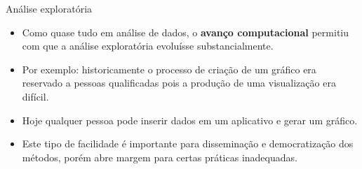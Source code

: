 \documentclass[
  ignorenonframetext,
  serif,
  professionalfont,
  usenames,
  dvipsnames,
  aspectratio = 169]{beamer}
\begin{document}
\begin{frame}{Análise exploratória}
\label{anuxe1lise-exploratuxf3ria-3}
\begin{itemize}
\item
  Como quase tudo em análise de dados, o \textbf{avanço computacional}
  permitiu com que a análise exploratória evoluísse substancialmente.
\item
  Por exemplo: historicamente o processo de criação de um gráfico era
  reservado a pessoas qualificadas pois a produção de uma visualização
  era difícil.
\item
  Hoje qualquer pessoa pode inserir dados em um aplicativo e gerar um
  gráfico.
\item
  Este tipo de facilidade é importante para disseminação e
  democratização dos métodos, porém abre margem para certas práticas
  inadequadas.
\end{itemize}
\end{frame}
\end{document}
